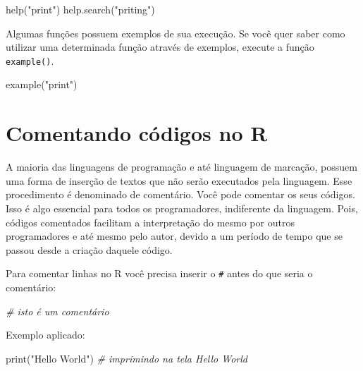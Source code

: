 \documentclass[
]{book}
\newenvironment{Shaded}{\begin{snugshade}}{\end{snugshade}}
\newcommand{\CommentTok}[1]{\textcolor[rgb]{0.56,0.35,0.01}{\textit{#1}}}
\newcommand{\FunctionTok}[1]{\textcolor[rgb]{0.00,0.00,0.00}{#1}}
\newcommand{\NormalTok}[1]{#1}
\newcommand{\StringTok}[1]{\textcolor[rgb]{0.31,0.60,0.02}{#1}}
\theoremstyle{definition}
\theoremstyle{definition}
\theoremstyle{definition}
\theoremstyle{definition}
\theoremstyle{remark}
\begin{document}
\begin{Shaded}
\begin{Highlighting}[]
\FunctionTok{help}\NormalTok{(}\StringTok{"print"}\NormalTok{)}
\FunctionTok{help.search}\NormalTok{(}\StringTok{"priting"}\NormalTok{)}
\end{Highlighting}
\end{Shaded}

Algumas funções possuem exemplos de sua execução. Se você quer saber como utilizar uma determinada função através de exemplos, execute a função \texttt{example()}.

\begin{Shaded}
\begin{Highlighting}[]
\FunctionTok{example}\NormalTok{(}\StringTok{"print"}\NormalTok{)}
\end{Highlighting}
\end{Shaded}

\hypertarget{comentando-cuxf3digos-no-r}{%
\section{Comentando códigos no R}\label{comentando-cuxf3digos-no-r}}

A maioria das linguagens de programação e até linguagem de marcação, possuem uma forma de inserção de textos que não serão executados pela linguagem. Esse procedimento é denominado de comentário. Você pode comentar os seus códigos. Isso é algo essencial para todos os programadores, indiferente da linguagem. Pois, códigos comentados facilitam a interpretação do mesmo por outros programadores e até mesmo pelo autor, devido a um período de tempo que se passou desde a criação daquele código.

Para comentar linhas no R você precisa inserir o \texttt{\#} antes do que seria o comentário:

\begin{Shaded}
\begin{Highlighting}[]
\CommentTok{\# isto é um comentário}
\end{Highlighting}
\end{Shaded}

Exemplo aplicado:

\begin{Shaded}
\begin{Highlighting}[]
\FunctionTok{print}\NormalTok{(}\StringTok{"Hello World"}\NormalTok{) }\CommentTok{\# imprimindo na tela Hello World}
\end{Highlighting}
\end{Shaded}
\end{document}
